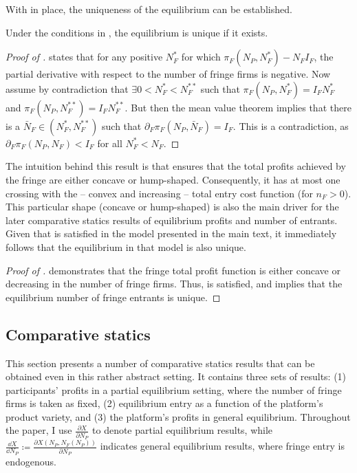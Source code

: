 With  in place, the uniqueness of the equilibrium can be established.
\begin{proposition}
    \label{prop:unique_equilibrium_more_general}
    Under the conditions in , the equilibrium is unique if it exists.
\end{proposition}
\begin{proof}[Proof of ]
     states that for any positive $N_F^*$ for which $\pi_F(N_P, N_F^*) - N_F I_F$, the partial derivative with respect to the number of fringe firms is negative.
    Now assume by contradiction that $\exists 0 < N_F^* < N_F^{**}$ such that $\pi_F(N_P, N_F^*) = I_F N_F^*$ and $\pi_F(N_P, N_F^{**}) = I_F N_F^{**}$.
    But then the mean value theorem implies that there is a $\bar{N}_F \in (N_F^*, N_F^{**})$ such that $\partial_F \pi_F(N_P, \bar{N}_F) = I_F$.
    This is a contradiction, as $\partial_F \pi_F(N_P, N_F) < I_F$ for all $N_F^* < N_F$.
\end{proof}

The intuition behind this result is that  ensures that the total profits achieved by the fringe are either concave or hump-shaped.
Consequently, it has at most one crossing with the -- convex and increasing -- total entry cost function (for $n_F > 0$).
This particular shape (concave or hump-shaped) is also the main driver for the later comparative statics results of equilibrium profits and number of entrants.
Given that  is satisfied in the model presented in the main text, it immediately follows that the equilibrium in that model is also unique.
\begin{proof}[Proof of ]
     demonstrates that the fringe total profit function is either concave or decreasing in the number of fringe firms.
    Thus,  is satisfied, and  implies that the equilibrium number of fringe entrants is unique.
\end{proof}

\subsection{Comparative statics}
\label{sec:more_general_results}

This section presents a number of comparative statics results that can be obtained even in this rather abstract setting.
It contains three sets of results: (1) participants' profits in a partial equilibrium setting, where the number of fringe firms is taken as fixed, (2) equilibrium entry as a function of the platform's product variety, and (3) the platform's profits in general equilibrium.
Throughout the paper, I use $\frac{\partial X}{\partial N_P}$ to denote partial equilibrium results, while $\frac{\dd X}{\dd N_P} \coloneq \frac{\partial X(N_P, N_F(N_P))}{\partial N_P}$ indicates general equilibrium results, where fringe entry is endogenous.

